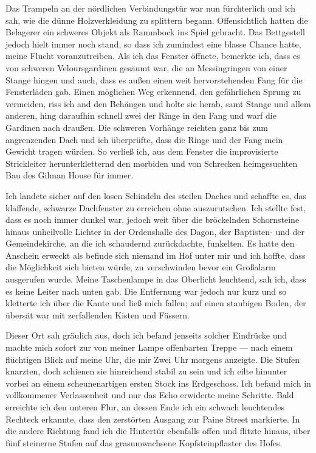 Das Trampeln an der nördlichen Verbindungstür war nun fürchterlich und ich sah, wie die dünne Holzverkleidung zu splittern begann. Offensichtlich hatten die Belagerer ein schweres Objekt als Rammbock ins Spiel gebracht. Das Bettgestell jedoch hielt immer noch stand, so dass ich zumindest eine blasse Chance hatte, meine Flucht voranzutreiben. Als ich das Fenster öffnete, bemerkte ich, dass es von schweren Veloursgardinen gesäumt war, die an Messingringen von einer Stange hingen und auch, dass es außen einen weit hervorstehenden Fang für die Fensterläden gab. Einen möglichen Weg erkennend, den gefährlichen Sprung zu vermeiden, riss ich and den Behängen und holte sie herab, samt Stange und allem anderen, hing daraufhin schnell zwei der Ringe in den Fang und warf die Gardinen nach draußen. Die schweren Vorhänge reichten ganz bis zum angrenzenden Dach und ich überprüfte, dass die Ringe und der Fang mein Gewicht tragen würden. So verließ ich, aus dem Fenster die improvisierte Strickleiter herunterkletternd den morbiden und von Schrecken heimgesuchten Bau des Gilman House für immer.

Ich landete sicher auf den losen Schindeln des steilen Daches und schaffte es, das klaffende, schwarze Dachfenster zu erreichen ohne auszurutschen. Ich stellte fest, dass es noch immer dunkel war, jedoch weit über die bröckelnden Schornsteine hinaus unheilvolle Lichter in der Ordenshalle des Dagon, der Baptisten- und der Gemeindekirche, an die ich schaudernd zurückdachte, funkelten. Es hatte den Anschein erweckt als befinde sich niemand im Hof unter mir und ich hoffte, dass die Möglichkeit sich bieten würde, zu verschwinden bevor ein Großalarm ausgerufen wurde. Meine Taschenlampe in das Oberlicht leuchtend, sah ich, dass es keine Leiter nach unten gab. Die Entfernung war jedoch nur kurz und so kletterte ich über die Kante und ließ mich fallen; auf einen staubigen Boden, der übersät war mit zerfallenden Kisten und Fässern.

Dieser Ort sah gräulich aus, doch ich befand jenseits solcher Eindrücke und machte mich sofort zur von meiner Lampe offenbarten Treppe --- nach einem flüchtigen Blick auf meine Uhr, die mir Zwei Uhr morgens anzeigte. Die Stufen knarzten, doch schienen sie hinreichend stabil zu sein und ich eilte hinunter vorbei an einem scheunenartigen ersten Stock ins Erdgeschoss. Ich befand mich in vollkommener Verlassenheit und nur das Echo erwiderte meine Schritte. Bald erreichte ich den unteren Flur, an dessen Ende ich ein schwach leuchtendes Rechteck erkannte, dass den zerstörten Ausgang zur Paine Street markierte. In die andere Richtung fand ich die Hintertür ebenfalls offen und flitzte hinaus, über fünf steinerne Stufen auf das grasumwachsene Kopfsteinpflaster des Hofes.

